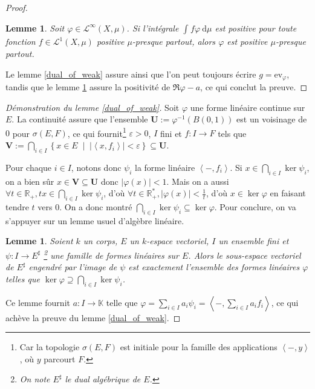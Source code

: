 \documentclass[a4paper,12pt]{article}
\newtheorem{lemma}[theorem]{Lemme}
\newcommand{\R}{\mathbb{R}}
\newcommand{\K}{\mathbb{K}}
\newcommand{\ev}{\mathrm{ev}}
\newcommand{\abs}[1]{\left\vert#1\right\vert}
\newcommand{\ket}[1]{\left\langle #1 \right\rangle}
\newcommand{\set}[1]{\left\{ #1 \right\}}
\newcommand{\integral}[4]{\int_{#1}^{#2} #3~\mathrm{d}#4}
\newcommand{\tq}{\;\middle|\;}
\newcommand{\inv}{^{-1}}
\newcommand{\blank}{{-}}
\begin{document}
\begin{proof}
\begin{lemma}\label{positive_of_positive_form}
    Soit $\varphi\in\mathscr{L}^\infty(X, \mu)$. Si l'intégrale $\integral{}{}{f\varphi}{\mu}$ est positive 
    pour toute fonction $f\in\mathscr{L}^1(X, \mu)$ positive $\mu$-presque partout, alors $\varphi$ est 
    positive $\mu$-presque partout.
\end{lemma}

Le lemme \ref{dual_of_weak} assure ainsi que l'on peut toujours écrire $g=\ev_\varphi$,
tandis que le lemme \ref{positive_of_positive_form} assure la positivité de $\Re\varphi - a$, ce qui conclut la preuve.
\end{proof}

\begin{proof}[Démonstration du lemme \ref{dual_of_weak}]
    Soit $\varphi$ une forme linéaire continue sur $E$. La continuité assure que l'ensemble $\mathbf{U} := \varphi\inv(B(0, 1))$ est un voisinage
    de $0$ pour $\sigma(E, F)$, ce qui fournit\footnote{Car la topologie $\sigma(E, F)$ est initiale 
    pour la famille des applications $\ket{\blank, y}$, où $y$ parcourt $F$.} $\varepsilon>0$, $I$ fini et $f : I\to F$ tels que
    $\mathbf{V} := \bigcap_{i\in I} \set{x\in E\tq \abs{\ket{x, f_i}}<\varepsilon}\subseteq\mathbf{U}$. 
    
    Pour chaque $i\in I$, notons donc $\psi_i$ la forme linéaire $\ket{\blank, f_i}$. Si $x\in\bigcap_{i\in I}\ker\psi_i$, on a bien sûr 
    $x\in\mathbf{V}\subseteq\mathbf{U}$ donc $\abs{\varphi(x)}<1$. Mais on a aussi $\forall t\in\R_+, tx\in\bigcap_{i\in I}\ker\psi_i$, d'où 
    $\forall t\in\R_+^*, \abs{\varphi(x)}<\frac1t$, d'où $x\in\ker\varphi$ en faisant tendre $t$ vers $0$. 
    On a donc montré $\bigcap_{i\in I}\ker\psi_i\subseteq\ker\varphi$. Pour conclure, on va s'appuyer sur un lemme usuel d'algèbre linéaire.
    \begin{lemma}\label{span_dual_of_ker}
        Soient $k$ un corps, $E$ un $k$-espace vectoriel, $I$ un ensemble fini et $\psi : I\to E^\sharp$
        \footnote{On note $E^\sharp$ le dual algébrique de $E$.} une famille de formes linéaires sur $E$.
        Alors le sous-espace vectoriel de $E^\sharp$ engendré par l'image de $\psi$ est exactement l'ensemble 
        des formes linéaires $\varphi$ telles que $\ker\varphi\supseteq\bigcap_{i\in I}\ker\psi_i$.
    \end{lemma}

    Ce lemme fournit  $a : I\to\K$ telle que $\varphi = \sum_{i\in I} a_i\psi_i = \ket{\blank, \sum_{i\in I} a_i f_i}$,
    ce qui achève la preuve du lemme \ref{dual_of_weak}.
\end{proof}
\end{document}
